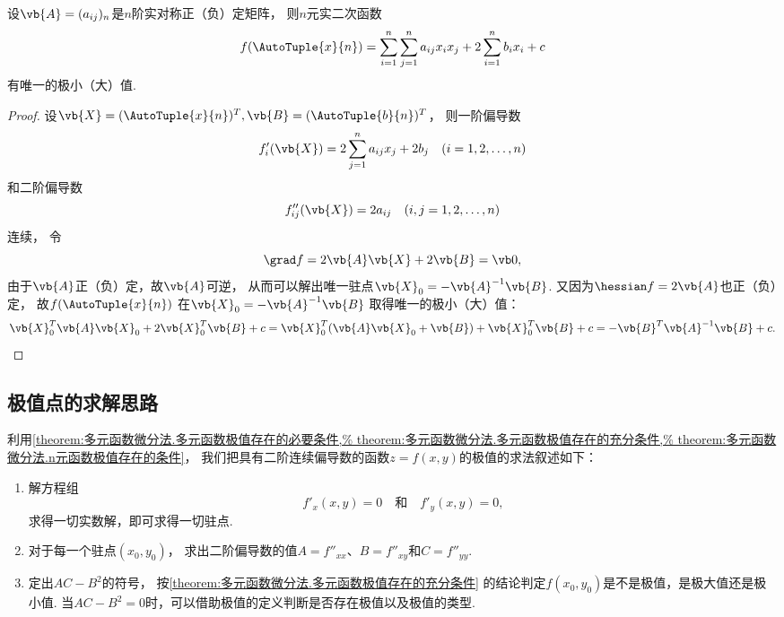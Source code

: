 \begin{proposition}
设\(\vb{A} = (a_{ij})_n\)是\(n\)阶实对称正（负）定矩阵，
则\(n\)元实二次函数\begin{equation*}
	f(\AutoTuple{x}{n})
	= \sum_{i=1}^n \sum_{j=1}^n a_{ij} x_i x_j
	+ 2 \sum_{i=1}^n b_i x_i + c
\end{equation*}有唯一的极小（大）值.
\begin{proof}
设\(\vb{X} = (\AutoTuple{x}{n})^T,
\vb{B} = (\AutoTuple{b}{n})^T\)，
则一阶偏导数\begin{equation*}
	f'_i(\vb{X})
	= 2 \sum_{j=1}^n a_{ij} x_j + 2 b_j
	\quad(i=1,2,\dotsc,n)
\end{equation*}和二阶偏导数\begin{equation*}
	f''_{ij}(\vb{X})
	= 2 a_{ij}
	\quad(i,j=1,2,\dotsc,n)
\end{equation*}连续，
令\begin{equation*}
	\grad f
	= 2 \vb{A} \vb{X} + 2 \vb{B}
	= \vb0,
\end{equation*}
由于\(\vb{A}\)正（负）定，故\(\vb{A}\)可逆，
从而可以解出唯一驻点\(\vb{X}_0 = -\vb{A}^{-1} \vb{B}\).
又因为\(\hessian f
= 2 \vb{A}\)也正（负）定，
故\(f(\AutoTuple{x}{n})\)
在\(\vb{X}_0 = -\vb{A}^{-1} \vb{B}\)
取得唯一的极小（大）值：\begin{equation*}
	\vb{X}_0^T \vb{A} \vb{X}_0
	+ 2 \vb{X}_0^T \vb{B} + c
	= \vb{X}_0^T (\vb{A} \vb{X}_0 + \vb{B})
	+ \vb{X}_0^T \vb{B} + c
	= -\vb{B}^T \vb{A}^{-1} \vb{B} + c.
	\qedhere
\end{equation*}
\end{proof}
\end{proposition}

\subsection{极值点的求解思路}
利用\cref{theorem:多元函数微分法.多元函数极值存在的必要条件,%
theorem:多元函数微分法.多元函数极值存在的充分条件,%
theorem:多元函数微分法.n元函数极值存在的条件}，
我们把具有二阶连续偏导数的函数\(z = f(x,y)\)的极值的求法叙述如下：
\begin{enumerate}
	\item 解方程组\begin{equation*}
		f'_x(x,y) = 0
		\quad\text{和}\quad
		f'_y(x,y) = 0,
	\end{equation*}求得一切实数解，即可求得一切驻点.

	\item 对于每一个驻点\((x_0,y_0)\)，
	求出二阶偏导数的值\(A=f''_{xx}\)、\(B=f''_{xy}\)和\(C=f''_{yy}\).

	\item 定出\(AC-B^2\)的符号，
	按\cref{theorem:多元函数微分法.多元函数极值存在的充分条件}
	的结论判定\(f(x_0,y_0)\)是不是极值，是极大值还是极小值.
	当\(AC-B^2=0\)时，可以借助极值的定义判断是否存在极值以及极值的类型.
\end{enumerate}

